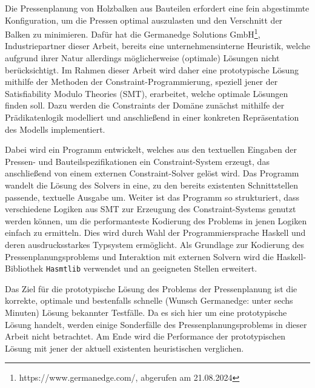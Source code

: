 \abstract
\label{Abstrakt}

Die Pressenplanung von Holzbalken aus Bauteilen erfordert eine fein abgestimmte Konfiguration, um die Pressen optimal auszulasten und den Verschnitt der Balken zu minimieren.
Dafür hat die Germanedge Solutions GmbH\footnote{https://www.germanedge.com/, abgerufen am 21.08.2024}, Industriepartner dieser Arbeit, bereits eine unternehmensinterne Heuristik, welche aufgrund ihrer Natur allerdings möglicherweise (optimale) Lösungen nicht berücksichtigt.
Im Rahmen dieser Arbeit wird daher eine prototypische Lösung mithilfe der Methoden der Constraint-Programmierung, speziell jener der Satisfiability Modulo Theories (SMT), erarbeitet, welche optimale Lösungen finden soll.
Dazu werden die Constraints der Domäne zunächst mithilfe der Prädikatenlogik modelliert und anschließend in einer konkreten Repräsentation des Modells implementiert.

Dabei wird ein Programm entwickelt, welches aus den textuellen Eingaben der Pressen- und Bauteilspezifikationen ein Constraint-System erzeugt, das anschließend von einem externen Constraint-Solver gelöst wird.
Das Programm wandelt die Lösung des Solvers in eine, zu den bereits existenten Schnittstellen passende, textuelle Ausgabe um.
Weiter ist das Programm so strukturiert, dass verschiedene Logiken aus SMT zur Erzeugung des Constraint-Systems genutzt werden können,
um die performanteste Kodierung des Problems in jenen Logiken einfach zu ermitteln.
Dies wird durch Wahl der Programmiersprache Haskell und deren ausdrucksstarkes Typsystem ermöglicht.
Als Grundlage zur Kodierung des Pressenplanungsproblems und Interaktion mit externen Solvern
wird die Haskell-Bibliothek \texttt{Hasmtlib} \cite{hasmtlib} verwendet und an geeigneten Stellen erweitert.

Das Ziel für die prototypische Lösung des Problems der Pressenplanung ist die korrekte, optimale und bestenfalls schnelle (Wunsch Germanedge: unter sechs Minuten) Lösung bekannter Testfälle.
Da es sich hier um eine prototypische Lösung handelt, werden einige Sonderfälle des Pressenplanungsproblems in dieser Arbeit nicht betrachtet.
Am Ende wird die Performance der prototypischen Lösung mit jener der aktuell existenten heuristischen verglichen.
